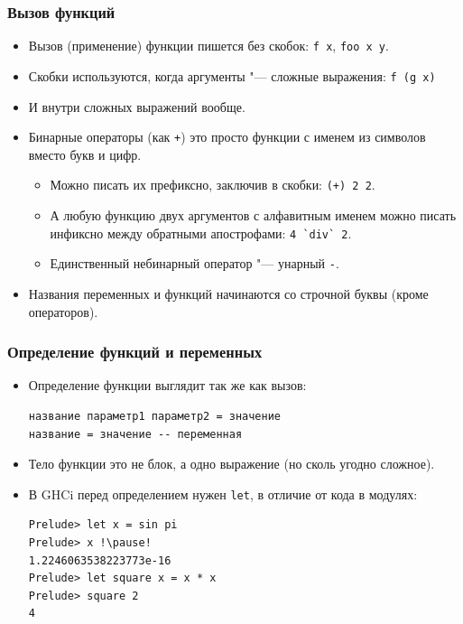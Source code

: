 \documentclass[10pt]{beamer}
\begin{document}
\begin{frame}[fragile]
\frametitle{Вызов функций}
\begin{itemize}
    \item Вызов (применение) функции пишется без скобок: \lstinline|f x|, \lstinline|foo x y|. 
    \item Скобки используются, когда аргументы "--- сложные выражения: \lstinline|f (g x)|
    \item И внутри сложных выражений вообще.
    \item Бинарные операторы (как \lstinline|+|) это просто функции с именем из символов вместо букв и цифр.
    \begin{itemize}
        \item Можно писать их префиксно, заключив в скобки: \lstinline[breaklines=false]|(+) 2 2|.
        \item А любую функцию двух аргументов с алфавитным именем можно писать инфиксно между обратными апострофами:
        \lstinline|4 `div` 2|.
        \item Единственный небинарный оператор "--- унарный \lstinline|-|.
    \end{itemize}
    \item Названия переменных и функций начинаются со строчной буквы (кроме операторов).
\end{itemize}
\end{frame}

\begin{frame}[fragile]
\frametitle{Определение функций и переменных}
\begin{itemize}
    \item Определение функции выглядит так же как вызов:
\begin{lstlisting}[breaklines]
название параметр1 параметр2 = значение
название = значение -- переменная
\end{lstlisting}
    \item Тело функции это не блок, а одно выражение (но сколь угодно сложное).
    \item В GHCi перед определением нужен \lstinline|let|, в отличие от кода в модулях:
\begin{lstlisting}
Prelude> let x = sin pi
Prelude> x !\pause!
1.2246063538223773e-16
Prelude> let square x = x * x
Prelude> square 2
4
\end{lstlisting}
\end{itemize}
\end{frame}
\end{document}
